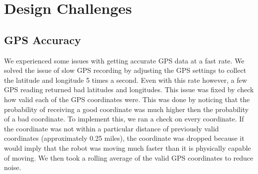\documentclass[final,letterpaper,singleside,12pt]{article}
\begin{document}
\section{Design Challenges} %
\label{sec:design_challenges}

\subsection{GPS Accuracy} %
\label{sub:gps_accuracy}
We experienced some issues with getting accurate GPS data at a fast rate. We solved the issue of slow GPS recording by adjusting the GPS settings to collect the latitude and longitude 5 times a second. Even with this rate however, a few GPS reading returned bad latitudes and longitudes. This issue was fixed by check how valid each of the GPS coordinates were. This was done by noticing that the probability of receiving a good coordinate was much higher then the probability of a bad coordinate. To implement this, we ran a check on every coordinate. If the coordinate was not within a particular distance of previously valid coordinates (approximately 0.25 miles), the coordinate was dropped because it would imply that the robot was moving much faster than it is physically capable of moving. We then took a rolling average of the valid GPS coordinates to reduce noise.
\end{document}
